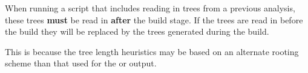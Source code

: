 {When running a script that includes reading in trees from a previous analysis, these trees {\bf must} be read 
in {\bf after} the build stage.  If the trees are read in before the build they will be replaced by the trees 
generated during the build.}

{This is because the tree length heuristics may be based on an alternate rooting scheme than that 
used for the  or  output.}